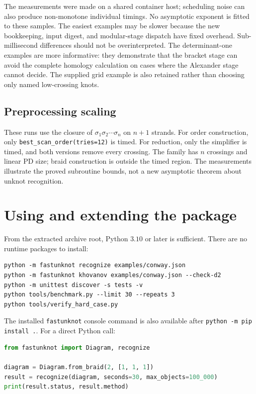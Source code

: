 \documentclass[11pt]{article}
\theoremstyle{remark}\newtheorem{remark}[theorem]{Remark}
\newcommand{\code}[1]{\texttt{\small #1}}
\begin{document}

The measurements were made on a shared container host; scheduling noise can
also produce non-monotone individual timings. No asymptotic exponent is fitted
to these samples. The easiest examples may be slower because the new bookkeeping, input digest,
and modular-stage dispatch have fixed overhead. Sub-millisecond differences
should not be overinterpreted. The determinant-one examples are more
informative: they demonstrate that the bracket stage can avoid the complete
homology calculation on cases where the Alexander stage cannot decide.
The supplied grid example is also retained rather than choosing only named
low-crossing knots.

\subsection{Preprocessing scaling}


These runs use the closure of
$\sigma_1\sigma_2\cdots\sigma_n$ on $n+1$ strands. For order construction,
only \code{best\_scan\_order(tries=12)} is timed. For reduction, only the
simplifier is timed, and both versions remove every crossing. The family
has $n$ crossings and linear PD size; braid construction is outside the
timed region. The measurements illustrate the proved subroutine bounds,
not a new asymptotic theorem about unknot recognition.

\clearpage
\section{Using and extending the package}

From the extracted archive root, Python $3.10$ or later is sufficient.
There are no runtime packages to install:
\begin{lstlisting}
python -m fastunknot recognize examples/conway.json
python -m fastunknot khovanov examples/conway.json --check-d2
python -m unittest discover -s tests -v
python tools/benchmark.py --limit 30 --repeats 3
python tools/verify_hard_case.py
\end{lstlisting}
The installed \code{fastunknot} console command is also available after
\code{python -m pip install .}. For a direct Python call:
\begin{lstlisting}[language=Python]
from fastunknot import Diagram, recognize

diagram = Diagram.from_braid(2, [1, 1, 1])
result = recognize(diagram, seconds=30, max_objects=100_000)
print(result.status, result.method)
\end{lstlisting}
\end{document}
